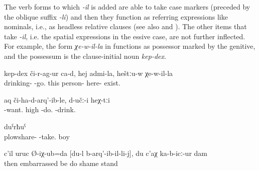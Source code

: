 The verb forms to which \textit{-il} is added are able to take case markers (preceded by the oblique suffix \textit{-li}) and then they function as referring expressions like nominals, i.e., as headless relative clauses  (see also  and ). The other items that take \textit{-il}, i.e. the spatial expressions in the essive case, are not further inflected. For example, the form \textit{χe-w-il-la} in  functions as possessor marked by the genitive, and the possessum is the clause-initial noun \textit{kep-dex}.

%
\begin{exe}

	\ex	\label{ex:‎‎the drunkenness passed, of this person who is here (on this picture)}
	\gll	kep-dex či-r-ag-ur ca-d, hej admi-la, heštːu-w χe-w-il-la\\
		drinking-	-go.		this	person-	here-	exist. \\
	\glt	{}
	
	\ex	\label{ex:The one who wanted (milk) lifted (the cans) up and}
	\gll	[b-ikː-an-il-li]	aq	či-ha-d-arq'-ib-le,	d-učː-i	heχ-tːi\\
		-want.	high	-do.	-drink.	 \\
	\glt	{}

	\ex	\label{ex:the son of (the one) who took away our ploughshare}
		duˁrħuˁ\\
			plowshare-	-take.	boy\\
	\glt	{}
	
		\ex	\label{ex:‎Then I was embarrassed for what I had done; I felt ashamed}
	\gll	c'il	uruc	Ø-iχ-ub=da	[du-l	b-arq'-ib-il-li-j],	du	c'aχ	ka-b-icː-ur	dam\\
		then	embarrassed	be		do		shame	stand	\\
	\glt	{}
\end{exe}	

